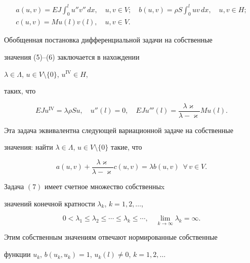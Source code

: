 \begin{gather*} 


a(u,v)=E J\int^l_0 u'' v''\,dx,\quad u,v\in V;\quad 


b(u,v)=\rho S\int^l_0 u v\,dx,\quad u,v\in H; \\ 


c(u,v)=M u(l)v(l),\quad u,v\in V. 


\end{gather*} 


 


Обобщенная постановка дифференциальной задачи на собственные  


значения (5)--(6) заключается в нахождении 


$\lambda\in\Lambda$, $u\in V\setminus\{0\}$, $u^{\mathrm{IV}}\in H$, 


таких, что 


$$ 


E J u^{\mathrm{IV}}=\lambda\rho S u,\quad u''(l)=0,\quad 


E J u'''(l)=\frac{\lambda\varkappa}{\lambda-\varkappa}M u(l). 


$$ 


Эта задача эквивалентна следующей вариационной задаче на собственные  


значения: найти $\lambda\in\Lambda$, $u\in V\setminus\{0\}$ такие, что 


\begin{equation} 


a(u,v)+\frac{\lambda\varkappa}{\lambda-\varkappa}c(u,v)= 


\lambda b(u,v)\ \; \forall\,v\in V. 


\end{equation} 


 


\begin{thm} 


Задача $(7)$ имеет счетное множество собственныx


значений конечной кратности $\lambda_k$, $k=1,2,\dotsc$, 


$$ 


0<\lambda_1\le\lambda_2\le\dotsb\le\lambda_k\le\dotsb,\quad 


\lim_{k\to\infty}\lambda_k=\infty. 


$$ 


Этим собственным значениям отвечают нормированные собственные  


функции $u_k$, $b(u_k,u_k){=}1$, $u_k(l)\ne0$, $k=1,2,\dotsc$ 


\end{thm} 


